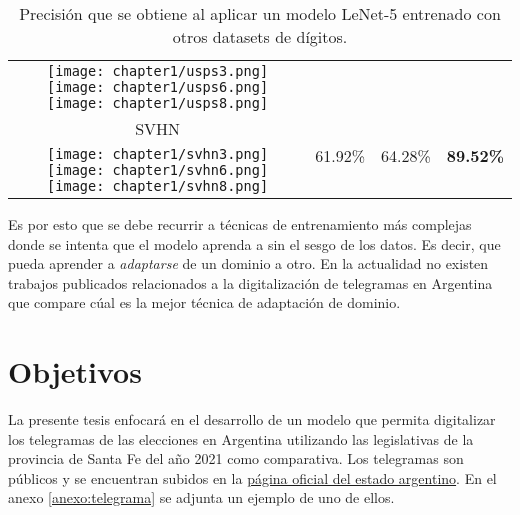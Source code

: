 \begin{table}[ht]
\begin{tabular}{cccc}
        \texttt{[image: chapter1/usps3.png]}
        \texttt{[image: chapter1/usps6.png]}
        \texttt{[image: chapter1/usps8.png]}  &                                                   &                                   &                                   \\
        SVHN                                              & \multirow{2}{*}{61.92\%}                          & \multirow{2}{*}{64.28\%}          & \multirow{2}{*}{\textbf{89.52\%}} \\
        \texttt{[image: chapter1/svhn3.png]}
        \texttt{[image: chapter1/svhn6.png]}
        \texttt{[image: chapter1/svhn8.png]}  &                                                   &                                   &                                   \\
        \bottomrule
    \end{tabular}
    \caption{Precisión que se obtiene al aplicar un modelo LeNet-5 entrenado con otros datasets de dígitos.}
    \label{tab:lenet-distintos-datasets}
\end{table}

Es por esto que se debe recurrir a t\'ecnicas de entrenamiento m\'as complejas donde se intenta que el modelo aprenda a
sin el sesgo de los datos. Es decir, que pueda aprender a {\it adaptarse} de un dominio a otro. En la actualidad no
existen trabajos publicados relacionados a la digitalizaci\'on de telegramas en Argentina que compare c\'ual es la
mejor t\'ecnica de adaptaci\'on de dominio.

\section{Objetivos}

La presente tesis enfocar\'a en el desarrollo de un modelo que permita digitalizar los telegramas de las elecciones en
Argentina utilizando las legislativas de la provincia de Santa Fe del a\~{n}o 2021 como comparativa. Los telegramas son
p\'ublicos y se encuentran subidos en la \href{https://op.elecciones.gob.ar/telegramas/generales2021/}{p\'agina oficial
    del estado argentino}. En el anexo \ref{anexo:telegrama} se adjunta un ejemplo de uno de ellos.

